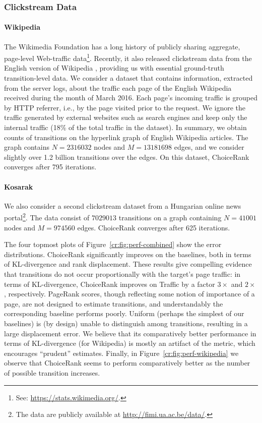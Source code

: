 \subsubsection{Clickstream Data}

\paragraph{Wikipedia}
The Wikimedia Foundation has a long history of publicly sharing aggregate, page-level Web-traffic data\footnote{See: \url{https://stats.wikimedia.org/}.}.
Recently, it also released clickstream data from the English version of Wikipedia \citep{wulczyn2016wikipedia}, providing us with essential ground-truth transition-level data.
We consider a dataset that contains information, extracted from the server logs, about the traffic each page of the English Wikipedia received during the month of March 2016.
Each page's incoming traffic is grouped by HTTP referrer, i.e., by the page visited prior to the request.
We ignore the traffic generated by external websites such as search engines and keep only the internal traffic (\num{18}\% of the total traffic in the dataset).
In summary, we obtain counts of transitions on the hyperlink graph of English Wikipedia articles.
The graph contains $N = \num{2316032}$ nodes and $M = \num{13181698}$ edges, and we consider slightly over \num{1.2} billion transitions over the edges.
On this dataset, ChoiceRank converges after \num{795} iterations.

\paragraph{Kosarak}
We also consider a second clickstream dataset from a Hungarian online news portal\footnote{The data are publicly available at \url{http://fimi.ua.ac.be/data/}.}.
The data consist of $\num{7029013}$ transitions on a graph containing $N = 41001$ nodes and $M = \num{974560}$ edges.
ChoiceRank converges after \num{625} iterations.

The four topmost plots of Figure~\ref{cr:fig:perf-combined} show the error distributions.
ChoiceRank significantly improves on the baselines, both in terms of KL-divergence and rank displacement.
These results give compelling evidence that transitions do not occur proportionally with the target's page traffic: in terms of KL-divergence, ChoiceRank improves on Traffic by a factor $3\times$ and $2\times$, respectively.
PageRank scores, though reflecting some notion of importance of a page, are not designed to estimate transitions, and understandably the corresponding baseline performs poorly.
Uniform (perhaps the simplest of our baselines) is (by design) unable to distinguish among transitions, resulting in a large displacement error.
We believe that its comparatively better performance in terms of KL-divergence (for Wikipedia) is mostly an artifact of the metric, which encourages ``prudent'' estimates.
Finally, in Figure~\ref{cr:fig:perf-wikipedia} we observe that ChoiceRank seems to perform comparatively better as the number of possible transition increases.


